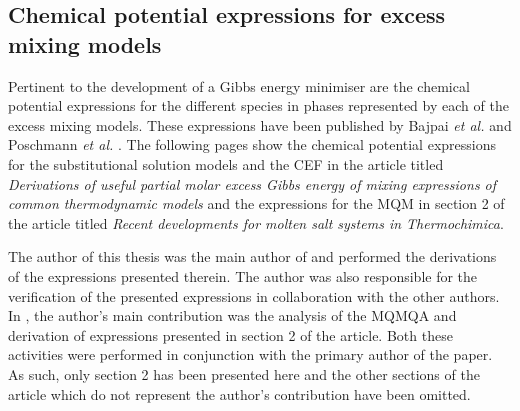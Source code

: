 	\subsection{Chemical potential expressions for excess mixing models}\label{sec:ChemPotExp}
	Pertinent to the development of a Gibbs energy minimiser are the chemical potential expressions for the different species in phases represented by each of the excess mixing models. These expressions have been published by Bajpai \textit{et al.} \cite{Bajpai:2021aa} and Poschmann \textit{et al.} \cite{Poschmann:2021ab}. The following pages show the chemical potential expressions for the substitutional solution models and the CEF in the article titled \textit{Derivations of useful partial molar excess Gibbs energy of mixing expressions of common thermodynamic models} and the expressions for the MQM in section 2 of the article titled \textit{Recent developments for molten salt systems in Thermochimica}. 
	
	The author of this thesis was the main author of \cite{Bajpai:2021aa} and performed the derivations of the expressions presented therein. The author was also responsible for the verification  of the presented expressions in collaboration with the other authors. In \cite{Poschmann:2021ab}, the author's main contribution was the analysis of the MQMQA and derivation of expressions presented in section 2 of the article. Both these activities were performed in conjunction with the primary author of the paper. As such, only section 2 has been presented here and the other sections of the article which do not represent the author's contribution have been omitted.	
	
	
